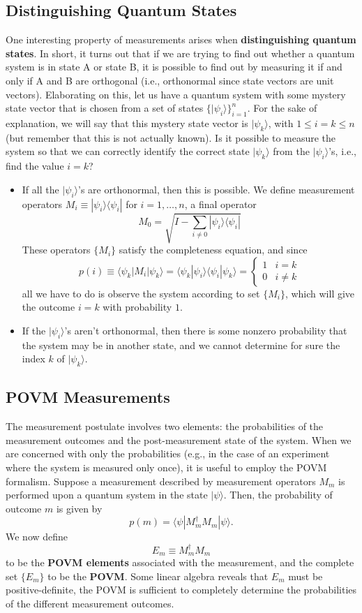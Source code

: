 \documentclass{article}
\theoremstyle{definition}
\begin{document}
\subsection*{Distinguishing Quantum States}
One interesting property of measurements arises when \textbf{distinguishing quantum states}. In short, it turns out that if we are trying to find out whether a quantum system is in state A or state B, it is possible to find out by measuring it if and only if A and B are orthogonal (i.e., orthonormal since state vectors are unit vectors). Elaborating on this, let us have a quantum system with some mystery state vector that is chosen from a set of states $\{|\psi_i \rangle \}_{i=1}^n$. For the sake of explanation, we will say that this mystery state vector is $|\psi_k \rangle$, with $1 \leq i = k \leq n$ (but remember that this is not actually known). Is it possible to measure the system so that we can correctly identify the correct state $|\psi_k \rangle$ from the $|\psi_i\rangle$'s, i.e., find the value $i=k$?
\begin{itemize}
  \item If all the $|\psi_i \rangle$'s are orthonormal, then this is possible. We define measurement operators $M_i \equiv |\psi_i \rangle \langle \psi_i |$ for $i = 1, \ldots, n$, a final operator
    \[M_0 = \sqrt{I - \sum_{i\neq 0} |\psi_i \rangle \langle \psi_i |}\]
  These operators $\{M_i\}$ satisfy the completeness equation, and since
    \[p(i) \equiv \langle \psi_k | M_i | \psi_k \rangle = \langle \psi_k | \psi_i \rangle \langle \psi_i | \psi_k \rangle = \begin{cases} 1 & i = k \\ 0 & i \neq k \end{cases}\]
  all we have to do is observe the system according to set $\{M_i\}$, which will give the outcome $i=k$ with probability $1$.
  \item If the $|\psi_i\rangle$'s aren't orthonormal, then there is some nonzero probability that the system may be in another state, and we cannot determine for sure the index $k$ of $|\psi_k \rangle$.
\end{itemize}

\subsection*{POVM Measurements}
The measurement postulate involves two elements: the probabilities of the measurement outcomes and the post-measurement state of the system. When we are concerned with only the probabilities (e.g., in the case of an experiment where the system is measured only once), it is useful to employ the POVM formalism. Suppose a measurement described by measurement operators $M_m$ is performed upon a quantum system in the state $|\psi\rangle$. Then, the probability of outcome $m$ is given by
\[p(m) = \langle \psi | M_m^\dagger M_m | \psi \rangle.\]
We now define
\[E_m \equiv M_m^\dagger M_m\]
to be the \textbf{POVM elements} associated with the measurement, and the complete set $\{E_m\}$ to be the \textbf{POVM}. Some linear algebra reveals that $E_m$ must be positive-definite, the POVM is sufficient to completely determine the probabilities of the different measurement outcomes.
\end{document}
